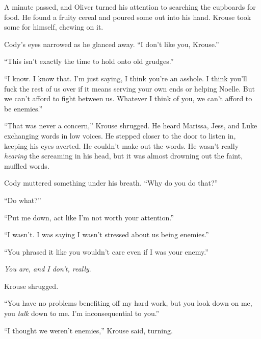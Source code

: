 A minute passed, and Oliver turned his attention to searching the cupboards for food.  He found a fruity cereal and poured some out into his hand.  Krouse took some for himself, chewing on it.



Cody's eyes narrowed as he glanced away.  ``I don't like you, Krouse.''



``This isn't exactly the time to hold onto old grudges.''



``I know.  I know that.  I'm just saying, I think you're an asshole.  I think you'll fuck the rest of us over if it means serving your own ends or helping Noelle.  But we can't afford to fight between us.  Whatever I think of you, we can't afford to be enemies.''



``That was never a concern,'' Krouse shrugged.  He heard Marissa, Jess, and Luke exchanging words in low voices.  He stepped closer to the door to listen in, keeping his eyes averted.  He couldn't make out the words.  He wasn't really \emph{hearing} the screaming in his head, but it was almost drowning out the faint, muffled words.



Cody muttered something under his breath.  ``Why do you do that?''



``Do what?''



``Put me down, act like I'm not worth your attention.''



``I wasn't.  I was saying I wasn't stressed about us being enemies.''



``You phrased it like you wouldn't care even if I was your enemy.''



\emph{You are, and I don't, really}.



Krouse shrugged.



``You have no problems benefiting off my hard work, but you look down on me, you \emph{talk} down to me.  I'm inconsequential to you.''



``I thought we weren't enemies,'' Krouse said, turning.



